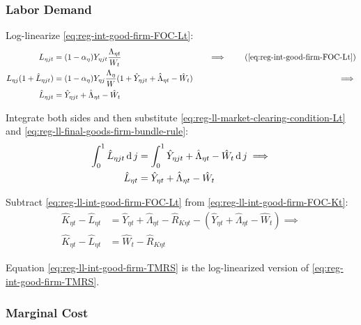 \documentclass[
thesis.tex
]{subfiles}
\begin{document}

\subsubsection*{Labor Demand}

Log-linearize \ref{eq:reg-int-good-firm-FOC-Lt}:
\begin{alignat}{2}
	L_{\eta jt} &= (1-{\alpha_{\eta}}) Y_{\eta jt} \frac{\Lambda_{\eta t}}{W_{t}} &\implies \tag{\ref{eq:reg-int-good-firm-FOC-Lt}} \\
	L_{\eta j} (1+ \hat{L}_{\eta jt}) &= (1-{\alpha_{\eta}}) Y_{\eta j} \frac{\Lambda_{\eta}}{W} (1+ \hat{Y}_{\eta jt} +\hat{\Lambda}_{\eta t} -\hat{W}_{t}) \quad &\implies \nonumber \\
	\hat{L}_{\eta jt} &= \hat{Y}_{\eta jt} +\hat{\Lambda}_{\eta t} -\hat{W}_{t} \nonumber
\end{alignat}

Integrate both sides and then substitute \ref{eq:reg-ll-market-clearing-condition-Lt} and \ref{eq:reg-ll-final-goods-firm-bundle-rule}:
\begin{align}
	\int_{0}^{1} \hat{L}_{\eta jt} \operatorname{d} j &= \int_{0}^{1} \hat{Y}_{\eta jt} + \hat{\Lambda}_{\eta t} - \hat{W}_{t} \operatorname{d} j \implies \nonumber \\
	\hat{L}_{\eta t} &= \hat{Y}_{\eta t} + \hat{\Lambda}_{\eta t} - \hat{W}_{t}
	\label{eq:reg-ll-int-good-firm-FOC-Lt}
\end{align}

Subtract \ref{eq:reg-ll-int-good-firm-FOC-Lt} from \ref{eq:reg-ll-int-good-firm-FOC-Kt}:
\begin{align}
	\hat{K}_{\eta t} - \hat{L}_{\eta t} &= \hat{Y}_{\eta t} + \hat{\Lambda}_{\eta t} - \hat{R}_{K \eta t} - (\hat{Y}_{\eta t} + \hat{\Lambda}_{\eta t} - \hat{W}_{t}) \implies \nonumber \\
	\hat{K}_{\eta t} - \hat{L}_{\eta t} &= \hat{W}_{t} - \hat{R}_{K \eta t} \label{eq:reg-ll-int-good-firm-TMRS}
\end{align}

Equation \ref{eq:reg-ll-int-good-firm-TMRS} is the log-linearized version of \ref{eq:reg-int-good-firm-TMRS}.


\subsubsection*{Marginal Cost}
\end{document}
